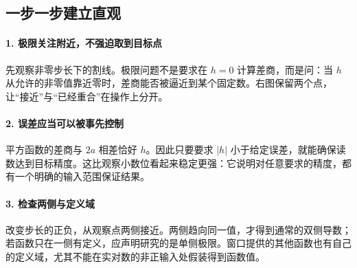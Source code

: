 \subsection*{一步一步建立直观}

\paragraph{1. 极限关注附近，不强迫取到目标点}

先观察非零步长下的割线。极限问题不是要求在 $h=0$ 计算差商，而是问：当 $h$ 从允许的非零值靠近零时，差商能否被逼近到某个固定数。右图保留两个点，让“接近”与“已经重合”在操作上分开。



\paragraph{2. 误差应当可以被事先控制}

平方函数的差商与 $2a$ 相差恰好 $h$。因此只要要求 $|h|$ 小于给定误差，就能确保读数达到目标精度。这比观察小数位看起来稳定更强：它说明对任意要求的精度，都有一个明确的输入范围保证结果。



\paragraph{3. 检查两侧与定义域}

改变步长的正负，从观察点两侧接近。两侧趋向同一值，才得到通常的双侧导数；若函数只在一侧有定义，应声明研究的是单侧极限。窗口提供的其他函数也有自己的定义域，尤其不能在实对数的非正输入处假装得到函数值。
